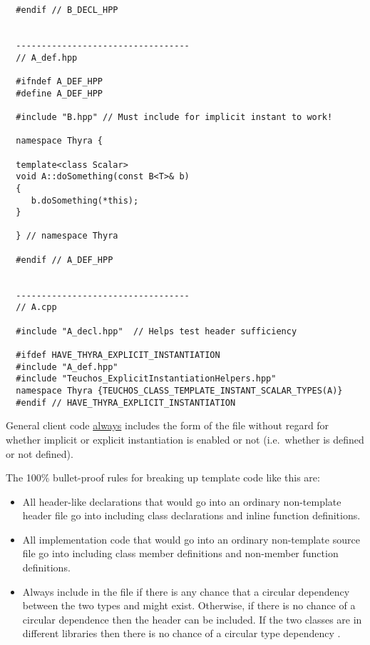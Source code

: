 \begin{itemize}
{\begin{verbatim}
  #endif // B_DECL_HPP


  ----------------------------------
  // A_def.hpp

  #ifndef A_DEF_HPP
  #define A_DEF_HPP

  #include "B.hpp" // Must include for implicit instant to work!

  namespace Thyra {

  template<class Scalar>
  void A::doSomething(const B<T>& b)
  {
     b.doSomething(*this);
  }

  } // namespace Thyra

  #endif // A_DEF_HPP


  ----------------------------------
  // A.cpp

  #include "A_decl.hpp"  // Helps test header sufficiency

  #ifdef HAVE_THYRA_EXPLICIT_INSTANTIATION
  #include "A_def.hpp"
  #include "Teuchos_ExplicitInstantiationHelpers.hpp"
  namespace Thyra {TEUCHOS_CLASS_TEMPLATE_INSTANT_SCALAR_TYPES(A)}
  #endif // HAVE_THYRA_EXPLICIT_INSTANTIATION
\end{verbatim}}


General client code {}\underline{always} includes the {} form of
the file without regard for whether implicit or explicit instantiation is
enabled or not (i.e.\ whether {} is
defined or not defined).

The 100\% bullet-proof rules for breaking up template code like this are:

\begin{itemize}

{}\item All header-like declarations that would go into an ordinary
non-template {} header file go into {}
including class declarations and inline function definitions.

{}\item All implementation code that would go into an ordinary non-template
{} source file go into {} including class
member definitions and non-member function definitions.

{}\item Always include {} in the
{} file if there is any chance that a circular
dependency between the two types {} and {}
might exist.  Otherwise, if there is no chance of a circular dependence then
the header {} can be included.  If the two classes
are in different libraries then there is no chance of a circular type
dependency {}\cite{AgileSoftwareDevelopment}.


\end{itemize}
\end{itemize}
